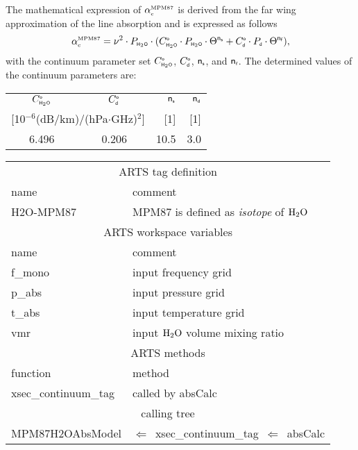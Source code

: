 The mathematical expression of $\alpha^{\mbox{\rm \tiny MPM87}}_{\mbox{\tiny c}}$ is derived from the far wing 
approximation of the line absorption and is expressed as follows
\begin{equation} 
  \label{eq:mpm87:cont}
  \alpha^{\mbox{\rm \tiny MPM87}}_{\mbox{\tiny c}} = \nu^2 \cdot P_{\mbox{\tiny \sf H}_{2}\mbox{\tiny \sf O}} \cdot 
                (C^{\mbox{\tiny \sf o}}_{\mbox{\tiny \sf H}_{2}\mbox{\tiny \sf O}} \cdot P_{\mbox{\tiny \sf H}_{2}\mbox{\tiny \sf O}} \cdot \Theta^{{\sf n}_{\mbox{\tiny \sf s}}} + 
                 C^{\mbox{\tiny \sf o}}_{\mbox{\tiny \sf d}} \cdot P_{\mbox{\tiny \sf d}}  \cdot \Theta^{{\sf n}_{\mbox{\tiny \sf f}}}),
\end{equation}
with the continuum parameter set $C^{\mbox{\tiny \sf o}}_{\mbox{\tiny \sf H}_{2}\mbox{\tiny \sf O}}$, $C^{\mbox{\tiny \sf o}}_{\mbox{\tiny \sf d}}$, ${\sf n}_{\mbox{\tiny \sf s}}$, and ${\sf n}_{\mbox{\tiny \sf f}}$. 
The determined values of the continuum parameters are:
\begin{center}
\begin{tabular}{ccrr}
\hline
\multicolumn{1}{c}{$C^{\mbox{\tiny \sf o}}_{\mbox{\tiny \sf H}_{2}\mbox{\tiny \sf O}}$} & \multicolumn{1}{c}{$C^{\mbox{\tiny \sf o}}_{\mbox{\tiny \sf d}}$} & ${\sf n}_{\mbox{\tiny \sf s}}$ & ${\sf n}_{\mbox{\tiny \sf d}}$ \\
\multicolumn{2}{c}{[10$^{-6}$(dB/km)/(hPa$\cdot$GHz)$^2$]} & [1] & [1] \\
\hline
6.496 & 0.206 & 10.5 & 3.0 \\
\hline
\end{tabular}
\end{center}
%
%
\begin{center}
\begin{tabular}{ll}
\hline
\multicolumn{2}{c}{ARTS tag definition}\\
name      & comment \\
H2O-MPM87 & MPM87 is defined as {\it isotope} of $\mbox{H}_2\mbox{O}$\\
\hline
\multicolumn{2}{c}{ARTS workspace variables}\\
name & comment \\
 f\_mono & input frequency grid \\
 p\_abs  & input pressure grid \\
 t\_abs  & input temperature grid\\
 vmr    & input $\mbox{H}_2\mbox{O}$ volume mixing ratio\\
\hline
\multicolumn{2}{c}{ARTS methods}\\
function           & method\\
xsec\_continuum\_tag & called by absCalc \\
\hline
\multicolumn{2}{c}{calling tree}\\
MPM87H2OAbsModel & $\Leftarrow$~xsec\_continuum\_tag~$\Leftarrow$~absCalc\\
\end{tabular}
\end{center}

